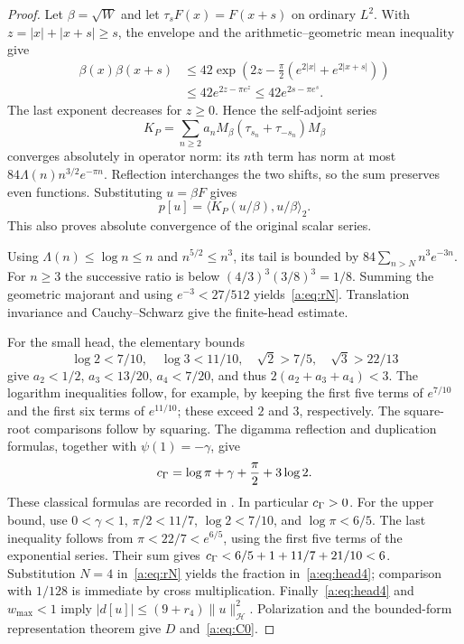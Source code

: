 \documentclass[11pt,a4paper]{article}
\numberwithin{equation}{section}
\theoremstyle{definition}\newtheorem{definition}[theorem]{Definition}
\theoremstyle{remark}\newtheorem{remark}[theorem]{Remark}
\newcommand{\Hh}{\mathcal H}\newcommand{\Hw}{\mathcal H}
\newcommand{\ip}[2]{\langle#1,#2\rangle}\newcommand{\norm}[1]{\lVert#1\rVert}\newcommand{\abs}[1]{\lvert#1\rvert}
\begin{document}
\begin{proof}
Let $\beta=\sqrt W$ and let $\tau_sF(x)=F(x+s)$ on ordinary $L^2$. With $z=|x|+|x+s|\ge s$, the envelope and the arithmetic--geometric mean inequality give
\begin{align*}
 \beta(x)\beta(x+s)
 &\le42\exp\left(2z-\frac\pi2(e^{2|x|}+e^{2|x+s|})\right)\\
 &\le42e^{2z-\pi e^z}\le42e^{2s-\pi e^s}.
\end{align*}
The last exponent decreases for $z\ge0$. Hence the self-adjoint series
\begin{equation}\label{a:eq:KP}
 K_P=\sum_{n\ge2}a_nM_\beta(\tau_{s_n}+\tau_{-s_n})M_\beta
\end{equation}
converges absolutely in operator norm: its $n$th term has norm at most
$84\Lambda(n)n^{3/2}e^{-\pi n}$.
Reflection interchanges the two shifts, so the sum preserves even functions. Substituting $u=\beta F$ gives
\begin{equation}\label{a:eq:prepresentation}
 p[u]=\ip{K_P(u/\beta)}{u/\beta}_2.
\end{equation}
This also proves absolute convergence of the original scalar series.

Using $\Lambda(n)\le\log n\le n$ and $n^{5/2}\le n^3$, its tail is bounded by
$84\sum_{n>N}n^3e^{-3n}$. For $n\ge3$ the successive ratio is below
$(4/3)^3(3/8)^3=1/8$. Summing the geometric majorant and using
$e^{-3}<27/512$ yields~\eqref{a:eq:rN}. Translation invariance and Cauchy--Schwarz give the finite-head estimate.

For the small head, the elementary bounds
\[
 \log2<7/10,\quad \log3<11/10,\quad
 \sqrt2>7/5,\quad \sqrt3>22/13
\]
give $a_2<1/2$, $a_3<13/20$, $a_4<7/20$, and thus
$2(a_2+a_3+a_4)<3$. The logarithm inequalities follow, for example, by keeping the first five terms of $e^{7/10}$ and the first six terms of $e^{11/10}$; these exceed $2$ and $3$, respectively. The square-root comparisons follow by squaring.
The digamma reflection and duplication formulas, together with $\psi(1)=-\gamma$, give
\[
 c_\Gamma=\log\pi+\gamma+\frac\pi2+3\log2.
\]
These classical formulas are recorded in \cite[Sections 5.4--5.5]{DLMF}. In particular $c_\Gamma>0$. For the upper bound, use $0<\gamma<1$, $\pi/2<11/7$, $\log2<7/10$, and $\log\pi<6/5$. The last inequality follows from $\pi<22/7<e^{6/5}$, using the first five terms of the exponential series. Their sum gives
$c_\Gamma<6/5+1+11/7+21/10<6$.
Substitution $N=4$ in~\eqref{a:eq:rN} yields the fraction in~\eqref{a:eq:head4}; comparison with $1/128$ is immediate by cross multiplication.
Finally~\eqref{a:eq:head4} and $w_{\max}<1$ imply
$|d[u]|\le(9+r_4)\norm u_{\Hh}^2$. Polarization and the bounded-form representation theorem give $D$ and~\eqref{a:eq:C0}.
\end{proof}
\end{document}

